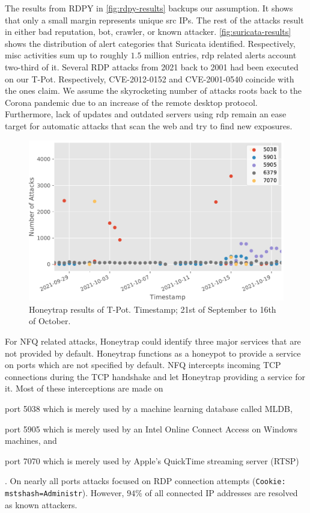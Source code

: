 The results from RDPY in \autoref{fig:rdpy-results} backups our assumption.
It shows that only a small margin represents unique src IPs.
The rest of the attacks result in either bad reputation, bot, crawler, or known attacker.
\autoref{fig:suricata-results} shows the distribution of alert categories that Suricata identified.
Respectively, misc activities sum up to roughly $1.5$ million entries, \ac{rdp} related alerts account two-third of it.
Several RDP attacks from 2021 back to 2001 had been executed on our T-Pot.
Respectively, CVE-2012-0152 and CVE-2001-0540 coincide with the ones \citet{Kelly2021} claim.
We assume the skyrocketing number of attacks roots back to the Corona pandemic due to an increase of the remote desktop protocol.
Furthermore, lack of updates and outdated servers using \ac{rdp} remain an ease target for automatic attacks that scan the web and try to find new exposures.

\begin{figure}[ht]
    \centering
    \includegraphics[width=\textwidth]{figures/tpot-honeytrap-port.pdf}
    \caption[Honeytrap results of T-Pot]{Honeytrap results of T-Pot. Timestamp; 21st of September to 16th of October.}
    \label{fig:honeytrap-results}
\end{figure}

For NFQ related attacks, Honeytrap could identify three major services that are not provided by default.
Honeytrap functions as a honeypot to provide a service on ports which are not specified by default.
NFQ intercepts incoming TCP connections during the TCP handshake and let Honeytrap providing a service for it.
Most of these interceptions are made on
\begin{enumerate*}[label=(\roman*)]
    \item port 5038 which is merely used by a machine learning database called MLDB,
    \item port 5905 which is merely used by an Intel Online Connect Access on Windows machines, and
    \item port 7070 which is merely used by Apple's QuickTime streaming server (RTSP)
\end{enumerate*}.
On nearly all ports attacks focused on RDP connection attempts (\verb|Cookie: mstshash=Administr|).
However, $94\%$ of all connected IP addresses are resolved as known attackers.

